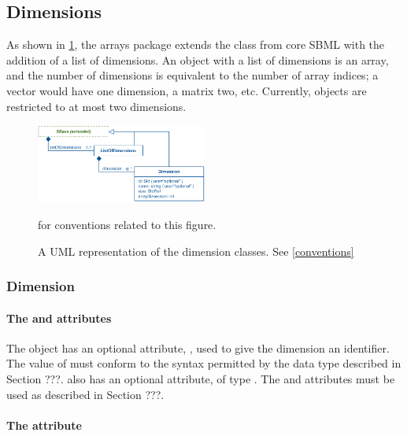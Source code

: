 \subsection{Dimensions}

As shown in \ref{fig:dimensions_uml}, the arrays package extends the \SBase class from core SBML with the addition of a list of dimensions.  An object with a list of dimensions is an array, and the number of dimensions is equivalent to the number of array indices; a vector would have one dimension, a matrix two, etc.  Currently, objects are restricted to at most two dimensions.  

\begin{figure}[tbhp]
  \centering
  \includegraphics[width=0.5\textwidth]{images/dimensionsUML.pdf}\\
  \caption{A UML representation of the dimension classes. See \ref{conventions}} for conventions related to this figure. \label{fig:dimensions_uml}
\end{figure}

\subsubsection{Dimension}
\label{sec:dimension}

\paragraph{The  and  attributes}

The \Dimension object has an optional attribute, , used to give the dimension an identifier.  The value of  must conform to the syntax permitted by the  data type described in Section ???.  \Dimension also has an optional  attribute, of type .  The  and  attributes must be used as described in Section ???.  

\paragraph{The  attribute}

